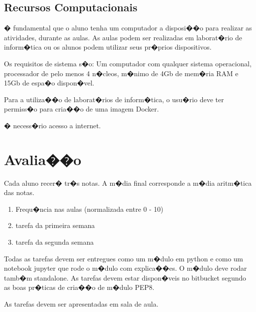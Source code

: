 \documentclass[a4paper, 11pt]{hitec}
\begin{document}
\subsection{Recursos Computacionais}

� fundamental que o aluno tenha um computador a disposi��o para realizar as atividades, durante as aulas. As aulas podem ser realizadas em laborat�rio de inform�tica ou os alunos podem utilizar seus pr�prios dispositivos.

Os requisitos de sistema s�o: Um computador com qualquer sistema operacional, processador de pelo menos 4 n�cleos, m�nimo de 4Gb de mem�ria RAM e 15Gb de espa�o dispon�vel.

Para a utiliza��o de laborat�rios de inform�tica, o usu�rio deve ter permiss�o para cria��o de uma imagem Docker.

� necess�rio acesso a internet.

\section{Avalia��o}

Cada aluno recer� tr�s notas. A m�dia final corresponde a m�dia aritm�tica das notas.

\begin{enumerate}
	\item Frequ�ncia nas aulas (normalizada entre 0 - 10)
	\item tarefa da primeira semana
	\item tarefa da segunda semana
\end{enumerate}

Todas as tarefas devem ser entregues como um m�dulo em python e como um notebook jupyter que rode o m�dulo com explica��es. O m�dulo deve rodar tamb�m standalone. As tarefas devem estar dispon�veis no bitbucket segundo as boas pr�ticas de cria��o de m�dulo PEP8.

As tarefas devem ser apresentadas em sala de aula.

%

%
\printbibliography
\end{document}
